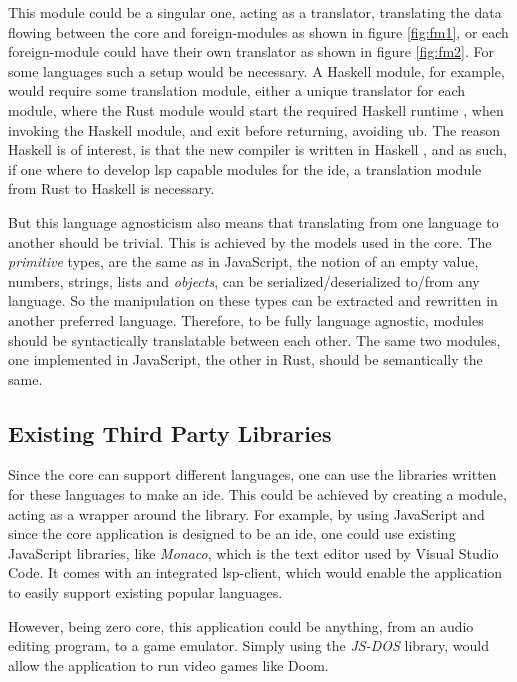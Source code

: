 This module could be a singular one, acting as a translator, translating the
data flowing between the core and foreign-modules as shown in figure
\ref{fig:fm1}, or each foreign-module could have their own translator as shown
in figure \ref{fig:fm2}. For some languages such a setup would be necessary.
A Haskell module, for example, would require some translation module, either a
unique translator for each module, where the Rust module would start the
required Haskell runtime \cite{ghcRts}, when invoking the Haskell module, and
exit before returning, avoiding \gls{ub}. The reason Haskell is of interest,
is that the new compiler is written in Haskell \cite{wiig}, and as such, if one
where to develop \gls{lsp} capable modules for the \gls{ide}, a translation
module from Rust to Haskell is necessary.


But this language agnosticism also means that
translating from one language to another should be trivial. This is achieved by
the models used in the core. The \textit{primitive} types, are the same as in
JavaScript, the notion of an empty value, numbers, strings, lists and
\textit{objects}, can be serialized/deserialized to/from any language. So the
manipulation on these types can be extracted and rewritten in another preferred
language. Therefore, to be fully language agnostic, modules should be
syntactically translatable between each other. The same two modules, one
implemented in JavaScript, the other in Rust, should be semantically the same.

\subsection{Existing Third Party Libraries}

Since the core can support different languages, one can use the libraries
written for these languages to make an \gls{ide}. This could be achieved by
creating a module, acting as a wrapper around the library. For example, by
using JavaScript and since the core application is designed to be an \gls{ide},
one could use existing JavaScript libraries, like \textit{Monaco}, which is the
text editor used by Visual Studio Code. It comes with an integrated
\gls{lsp}-client, which would enable the application to easily support existing
popular languages.

However, being zero core, this application could be anything, from an audio
editing program, to a game emulator. Simply using the \textit{JS-DOS} library,
would allow the application to run video games like Doom.

